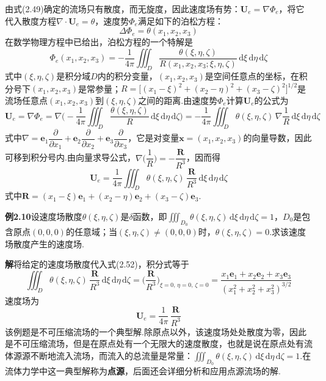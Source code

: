 由式(2.49)确定的流场只有散度，而无旋度，因此速度场有势：$\boldsymbol{U}_e=\nabla\Phi_e$，将它代入散度方程$\nabla\cdot\boldsymbol{U}_e=\theta$，速度势$\Phi_e$满足如下的泊松方程：
\[
\Delta\Phi_e=\theta(x_1,x_2,x_3)
\]
在数学物理方程中已给出，泊松方程的一个特解是
\begin{equation*}
\Phi_e(x_1,x_2,x_3)=-\frac{1}{4\pi}\iiint_D \frac{\theta(\xi,\eta,\zeta)}{R(x_1,x_2,x_3;\xi,\eta,\zeta)}\,\mathrm{d}\xi\,\mathrm{d}\eta\,\mathrm{d}\zeta
\tag{2.52a}
\end{equation*}
式中$(\xi,\eta,\zeta)$是积分域$D$内的积分变量，$(x_1,x_2,x_3)$是空间任意点的坐标，在积分号下$(x_1,x_2,x_3)$是常参量；$R=\big[(x_1-\xi)^{2}+(x_2-\eta)^{2}+(x_3-\zeta)^{2}\big]^{1/2}$是流场任意点$(x_1,x_2,x_3)$到$(\xi,\eta,\zeta)$之间的距离.由速度势$\Phi_e$计算$\boldsymbol{U}_e$的公式为
\[
\boldsymbol{U}_e=\nabla\Phi_e=\nabla\Big(-\frac{1}{4\pi}\iiint_D \frac{\theta(\xi,\eta,\zeta)}{R}\,\mathrm{d}\xi\,\mathrm{d}\eta\,\mathrm{d}\zeta\Big)=-\frac{1}{4\pi}\iiint_D \theta(\xi,\eta,\zeta)\,\nabla\frac{1}{R}\,\mathrm{d}\xi\,\mathrm{d}\eta\,\mathrm{d}\zeta
\]
式中$\nabla=\boldsymbol{e}_1\dfrac{\partial}{\partial x_1}+\boldsymbol{e}_2\dfrac{\partial}{\partial x_2}+\boldsymbol{e}_3\dfrac{\partial}{\partial x_3}$，它是对变量$\boldsymbol{x}=(x_1,x_2,x_3)$的向量导数，因此可移到积分号内.由向量求导公式，$\nabla\Big(\dfrac{1}{R}\Big)=-\dfrac{\boldsymbol{R}}{R^{3}}$，因而得
\begin{equation*}
\boldsymbol{U}_e=\frac{1}{4\pi}\iiint_D \theta(\xi,\eta,\zeta)\,\frac{\boldsymbol{R}}{R^{3}}\,\mathrm{d}\xi\,\mathrm{d}\eta\,\mathrm{d}\zeta
\tag{2.52b}
\end{equation*}
式中$\boldsymbol{R}=(x_1-\xi)\boldsymbol{e}_1+(x_2-\eta)\boldsymbol{e}_2+(x_3-\zeta)\boldsymbol{e}_3$.

\noindent\textbf{例2.10}\quad 设速度场散度$\theta(\xi,\eta,\zeta)$是$\delta$函数，即$\displaystyle\iiint_{D_0}\theta(\xi,\eta,\zeta)\,\mathrm{d}\xi\,\mathrm{d}\eta\,\mathrm{d}\zeta=1$，$D_0$是包含原点$(0,0,0)$的任意域；当$(\xi,\eta,\zeta)\neq(0,0,0)$时，$\theta(\xi,\eta,\zeta)=0$.求该速度场散度产生的速度场.

\noindent\textbf{解}\quad 将给定的速度场散度代入式(2.52)，积分式等于
\[
\iiint_D \theta(\xi,\eta,\zeta)\,\frac{\boldsymbol{R}}{R^{3}}\,\mathrm{d}\xi\,\mathrm{d}\eta\,\mathrm{d}\zeta=\Big(\frac{\boldsymbol{R}}{R^{3}}\Big)_{\!\xi=0,\,\eta=0,\,\zeta=0}=\frac{x_1\boldsymbol{e}_1+x_2\boldsymbol{e}_2+x_3\boldsymbol{e}_3}{(x_1^{2}+x_2^{2}+x_3^{2})^{3/2}}
\]
速度场为
\[
\boldsymbol{U}_e=\frac{1}{4\pi}\,\frac{\boldsymbol{R}}{R^{3}}
\]
该例题是不可压缩流场的一个典型解.除原点以外，该速度场处处散度为零，因此是不可压缩流场，但是在原点处有一个无限大的速度散度，也就是说在原点处有流体源源不断地流入流场，而流入的总流量是常量：$\displaystyle\iiint_{D_0}\theta(\xi,\eta,\zeta)\,\mathrm{d}\xi\,\mathrm{d}\eta\,\mathrm{d}\zeta=1$.在流体力学中这一典型解称为\textbf{点源}，后面还会详细分析和应用点源流场的解.

